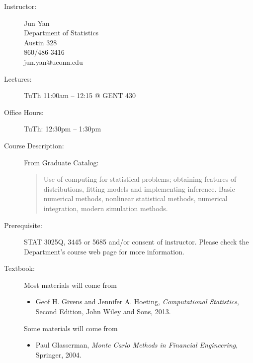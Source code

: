 \documentclass[twocolumn]{article}
\begin{document}


{}

\thispagestyle{fancy}


\begin{description}
\item[Instructor:] Jun Yan\\ 
  Department of Statistics\\
  Austin 328\\
  860/486-3416\\
  jun.yan@uconn.edu

\item[Lectures:] 
  TuTh 11:00am -- 12:15 @  GENT 430

\item[Office Hours:] 
  TuTh: 12:30pm -- 1:30pm


\item[Course Description:] From Graduate Catalog:
\begin{quote}
Use of computing for statistical problems; obtaining features of
distributions, fitting models and implementing inference. Basic numerical
methods, nonlinear statistical methods, numerical integration, modern
simulation methods.
\end{quote}

\item[Prerequisite:]
  STAT 3025Q, 3445 or 5685 and/or consent of instructor.  Please check
  the Department's course web page for more information.
 

\item[Textbook:] 
Most materials will come from 
\begin{itemize}
\item Geof H. Givens and Jennifer A. Hoeting,
  \emph{Computational Statistics\/}, Second Edition, John
  Wiley and Sons, 2013.
\end{itemize}

Some materials will come from
\begin{itemize}
\item Paul Glasserman, \emph{Monte Carlo Methods in
      Financial Engineering\/}, Springer, 2004.
\end{itemize}


\end{description}
\end{document}
